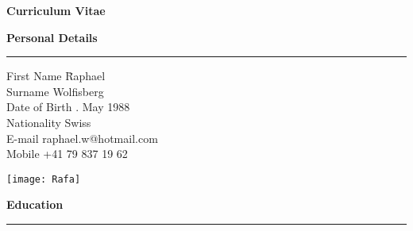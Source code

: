 



\graphicspath{{./Pictures/}}


\newpage
\pagestyle{plain}
\vspace{-9cm}

\huge
\textbf{Curriculum Vitae}

\bigskip
\bigskip
\Large
\textbf{Personal Details}
\noindent\rule[0mm]{\linewidth}{2pt}

\normalsize
\begin{tabbing}
First Name \hspace*{2.4cm} \= Raphael \\
Surname \> Wolfisberg \\
Date of Birth . May 1988 \\
Nationality \> Swiss \\
\medskip
E-mail \> raphael.w@hotmail.com \\
Mobile \> +41 79 837 19 62 
\end{tabbing}

\vspace{-4.4cm}
\begin{flushright}
\texttt{[image: Rafa]} \\[1cm]
\end{flushright}


\vspace{-1cm}
\Large
\textbf{Education}
\noindent\rule[0mm]{\linewidth}{2pt}

